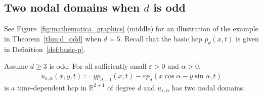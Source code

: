 \documentclass[AHL,Unicode,longabstracts,published]{cedram}
\newcommand{\R}{\mathbb{R}}
\renewcommand{\epsilon}{\varepsilon}
\newcommand{\R}{\mathbb{R}}
\begin{document}
\subsection{Two nodal domains when \texorpdfstring{$d$}{d} is odd} \label{subsec:1mod4}
See Figure~\ref{fig:mathematica_graphics} (middle) for an illustration of the example in Theorem~\ref{thm:d_odd} when $d=5$. {Recall that the basic hcp $p_d(x,t)$ is given in Definition~\ref{def:basic-p}}.

\begin{theo}\label{thm:d_odd}
Assume $d\geq 3$ is odd. For all sufficiently small $\epsilon>0$ and $\alpha>0$,
\begin{align}\label{eqn:d_odd_u}
u_{\epsilon,\alpha}(x,y,t) := y p_{d-1}(x,t) - \epsilon p_d(x\cos\alpha-y\sin\alpha,t)
\end{align}
is a time-dependent hcp in $\R^{2+1}$ of degree $d$ and $u_{\epsilon,\alpha}$ has two nodal domains.
\end{theo}
\end{document}
